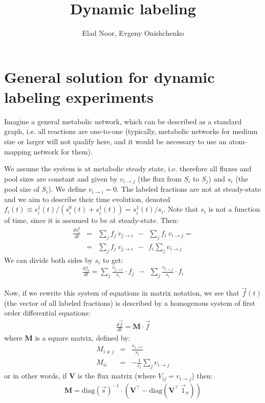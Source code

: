 \documentclass{article}
\title{Dynamic labeling}
\author{Elad Noor, Evgeny Onishchenko}
\begin{document}
\maketitle

\section{General solution for dynamic labeling experiments}
Imagine a general metabolic network, which can be described as a standard graph, i.e. all reactions are one-to-one (typically, metabolic networks for medium size or larger will not qualify here, and it would be necessary to use an atom-mapping network for them).

We assume the system is at metabolic steady state, i.e. therefore all fluxes and pool sizes are constant and given by $v_{i \rightarrow j}$ (the flux from $S_i$ to $S_j$) and $s_i$ (the pool size of $S_i$). We define $v_{i \rightarrow i} = 0$. The labeled fractions are not at steady-state and we aim to describe their time evolution, denoted $f_i(t) \equiv s_i^1(t) / (s_i^0(t) + s_i^1(t)) = s_i^1(t) / s_i$. Note that $s_i$ is not a function of time, since it is assumed to be at steady-state. Then:
\begin{eqnarray}
    \frac{d s_i^0}{dt} &=& \sum_j f_j~v_{j \rightarrow i} ~~-~~ \sum_j f_i~v_{i \rightarrow j} = \\
    &=& \sum_j f_j~v_{j \rightarrow i} ~~-~~ f_i \sum_j v_{i \rightarrow j}
\end{eqnarray}
We can divide both sides by $s_i$ to get:
\begin{eqnarray}
    \frac{d f_i}{dt} = \sum_j \frac{v_{j \rightarrow i}}{s_i} \cdot f_j ~~-~~ \sum_j \frac{v_{i \rightarrow j}}{s_i} \cdot f_i
\end{eqnarray}

Now, if we rewrite this system of equations in matrix notation, we see that $\vec{f}(t)$ (the vector of all labeled fractions) is described by a homogenous system of first order differential equations:
\begin{eqnarray}\label{eq:homogenous}
    \frac{d\vec{f}}{d t} = \mathbf{M} \cdot \vec{f}
\end{eqnarray}
where $\mathbf{M}$ is a square matrix, defined by:
\begin{eqnarray}
    M_{i \neq j} &=& \frac{v_{j \rightarrow i}}{s_i}\\
    M_{ii} &=& -\frac{1}{s_i}\sum_{j} v_{i \rightarrow j}
\end{eqnarray}
or in other words, if $\mathbf{V}$ is the flux matrix (where $V_{ij} = v_{i \rightarrow j}$) then:
\begin{eqnarray}
    \mathbf{M} = \text{diag}(\vec{s})^{-1} \cdot \left( \mathbf{V}^\top - \text{diag}(\mathbf{V}^\top~\vec{1}_n) \right)
\end{eqnarray}
\end{document}
